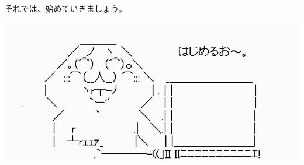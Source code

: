 \vspace*{\baselineskip}

それでは、始めていきましょう。

\begin{reviewimage}%
\includegraphics[width=1.0\maxwidth]{./images/00-preface/greetings04.png}%
\label{image:00-preface:greetings04}
\end{reviewimage}
